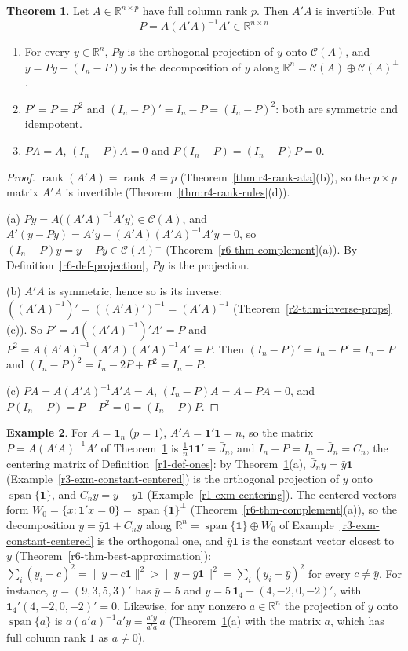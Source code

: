 \documentclass[12pt]{article}
\newcommand{\R}{\mathbb R}
\newcommand{\one}{\mathbf 1}
\DeclareMathOperator{\rank}{rank}
\DeclareMathOperator{\Span}{span}
\theoremstyle{definition}
\newtheorem{theorem}{Theorem}
\newtheorem{example}[theorem]{Example}
\begin{document}
\begin{theorem}\label{r6-thm-hat}
Let \(A\in\R^{n\times p}\) have full column rank \(p\). Then \(A'A\) is invertible. Put
\[
P=A(A'A)^{-1}A'\in\R^{n\times n}
\]
\begin{enumerate}
\item For every \(y\in\R^n\), \(Py\) is the orthogonal projection of \(y\) onto \(\mathcal C(A)\), and
\(y=Py+(I_n-P)y\) is the decomposition of \(y\) along \(\R^n=\mathcal C(A)\oplus\mathcal C(A)^\perp\).
\item \(P'=P=P^2\) and \((I_n-P)'=I_n-P=(I_n-P)^2\): both are symmetric and idempotent.
\item \(PA=A\), \((I_n-P)A=0\) and \(P(I_n-P)=(I_n-P)P=0\).
\end{enumerate}
\end{theorem}
\begin{proof}
\(\rank(A'A)=\rank A=p\) (Theorem~\ref{thm:r4-rank-ata}(b)), so the \(p\times p\) matrix \(A'A\) is
invertible (Theorem~\ref{thm:r4-rank-rules}(d)).

(a) \(Py=A\bigl((A'A)^{-1}A'y\bigr)\in\mathcal C(A)\), and \(A'(y-Py)=A'y-(A'A)(A'A)^{-1}A'y=0\), so
\((I_n-P)y=y-Py\in\mathcal C(A)^\perp\) (Theorem~\ref{r6-thm-complement}(a)). By
Definition~\ref{r6-def-projection}, \(Py\) is the projection.

(b) \(A'A\) is symmetric, hence so is its inverse:
\(((A'A)^{-1})'=((A'A)')^{-1}=(A'A)^{-1}\) (Theorem~\ref{r2-thm-inverse-props}(c)). So
\(P'=A((A'A)^{-1})'A'=P\) and \(P^2=A(A'A)^{-1}(A'A)(A'A)^{-1}A'=P\). Then \((I_n-P)'=I_n-P'=I_n-P\) and
\((I_n-P)^2=I_n-2P+P^2=I_n-P\).

(c) \(PA=A(A'A)^{-1}A'A=A\), \((I_n-P)A=A-PA=0\), and \(P(I_n-P)=P-P^2=0=(I_n-P)P\).
\end{proof}

\begin{example}\label{r6-exm-centering}
For \(A=\one_n\) (\(p=1\)), \(A'A=\one'\one=n\), so the matrix \(P=A(A'A)^{-1}A'\) of Theorem~\ref{r6-thm-hat} is
\(\frac1n\one\one'=\bar J_n\), and \(I_n-P=I_n-\bar J_n=C_n\), the centering matrix of Definition~\ref{r1-def-ones}:
by Theorem~\ref{r6-thm-hat}(a), \(\bar J_ny=\bar y\one\) (Example~\ref{r3-exm-constant-centered}) is the orthogonal
projection of \(y\) onto \(\Span\{\one\}\), and \(C_ny=y-\bar y\one\) (Example~\ref{r1-exm-centering}). The centered vectors form \(W_0=\{x:\one'x=0\}=\Span\{\one\}^\perp\)
(Theorem~\ref{r6-thm-complement}(a)), so the decomposition \(y=\bar y\one+C_ny\) along \(\R^n=\Span\{\one\}\oplus W_0\)
of Example~\ref{r3-exm-constant-centered} is the orthogonal one, and \(\bar y\one\) is the constant vector closest to
\(y\) (Theorem~\ref{r6-thm-best-approximation}): \(\sum_i(y_i-c)^2=\lVert y-c\one\rVert^2>\lVert y-\bar y\one\rVert^2
=\sum_i(y_i-\bar y)^2\) for every \(c\ne\bar y\). For instance, \(y=(9,3,5,3)'\) has \(\bar y=5\) and
\(y=5\,\one_4+(4,-2,0,-2)'\), with \(\one_4'(4,-2,0,-2)'=0\). Likewise, for any nonzero \(a\in\R^n\) the projection of
\(y\) onto \(\Span\{a\}\) is \(a(a'a)^{-1}a'y=\frac{a'y}{a'a}\,a\) (Theorem~\ref{r6-thm-hat}(a) with the matrix \(a\), which
has full column rank \(1\) as \(a\ne0\)).
\end{example}
\end{document}
